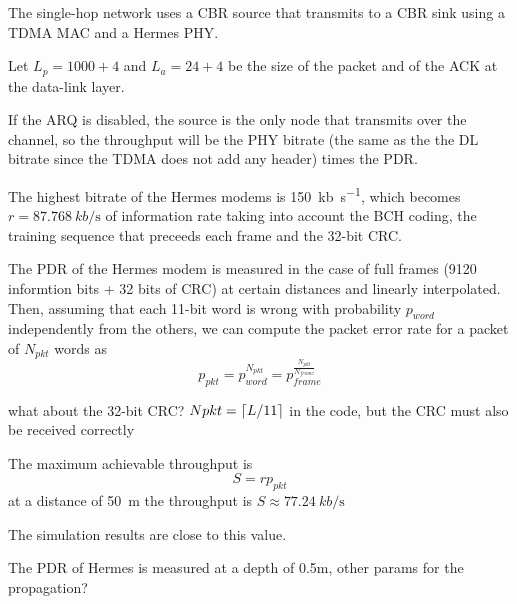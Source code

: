 The single-hop network uses a CBR source that transmits to a CBR sink
using a TDMA MAC and a Hermes PHY.

Let $L_p = 1000+4$ and $L_a = 24+4$ be the size of the packet and of the
ACK at the data-link layer.

If the ARQ is disabled, the source is the only node that transmits
over the channel, so the throughput will be the PHY bitrate (the same
as the the DL bitrate since the TDMA does not add any header) times
the PDR.

The highest bitrate of the Hermes modems is \SI{150}{kb\per\s}, which
becomes $r = \SI{87.768}{kb\per\s}$ of information rate taking into
account the BCH coding, the training sequence that preceeds each frame
and the 32-bit CRC.

The PDR of the Hermes modem is measured in the case of full frames
(9120 informtion bits + 32 bits of CRC) at certain distances and
linearly interpolated. Then, assuming that each 11-bit word is wrong
with probability $p_{word}$ independently from the others, we can
compute the packet error rate for a packet of $N_{pkt}$ words as
\begin{equation}
  p_{pkt} = p_{word}^{N_{pkt}} = p_{frame}^{\frac{N_{pkt}}{N_{frame}}}
\end{equation}

{\color{red} what about the 32-bit CRC? $N{pkt} = \left\lceil L/11\right\rceil$ in the
  code, but the CRC must also be received correctly}

The maximum achievable throughput is
\begin{equation}
  S = r p_{pkt}
\end{equation}
at a distance of \SI{50}{\m} the throughput is $S \approx
\SI{77.24}{kb\per\s}$

The simulation results are close to this value.

{\color{red} The PDR of Hermes is measured at a depth of 0.5m, other
  params for the propagation?}

